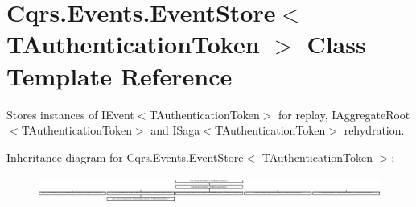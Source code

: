 \hypertarget{classCqrs_1_1Events_1_1EventStore}{}\section{Cqrs.\+Events.\+Event\+Store$<$ T\+Authentication\+Token $>$ Class Template Reference}
\label{classCqrs_1_1Events_1_1EventStore}


Stores instances of I\+Event$<$\+T\+Authentication\+Token$>$ for replay, I\+Aggregate\+Root$<$\+T\+Authentication\+Token$>$ and I\+Saga$<$\+T\+Authentication\+Token$>$ rehydration.  


Inheritance diagram for Cqrs.\+Events.\+Event\+Store$<$ T\+Authentication\+Token $>$\+:\begin{figure}[H]
\begin{center}
\leavevmode
\includegraphics[height=0.863198cm]{classCqrs_1_1Events_1_1EventStore}
\end{center}
\end{figure}
